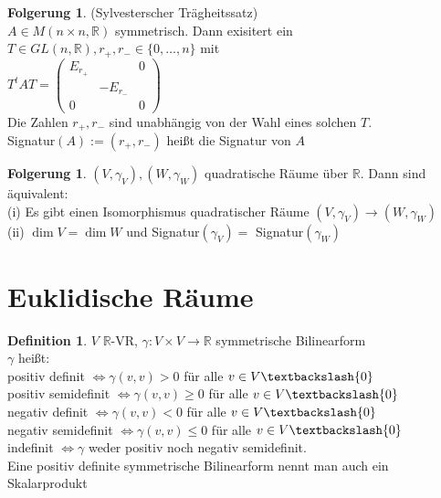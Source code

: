 \documentclass[10pt,a4paper,numbers=endperiod]{scrartcl}
\theoremstyle{definition}
\newtheorem{defi}[satz]{Definition}
\newtheorem{folg}[satz]{Folgerung}
\def\RR{{\mathbb R}}
\begin{document}
\begin{folg}
	(Sylvesterscher Trägheitssatz)\\
	$A \in M( n\times n, \RR)$ symmetrisch. Dann exisitert ein $T \in GL(n, \RR), r_+, r_- \in \{0,\ldots, n\}$ mit\\
	$T^tAT = \begin{pmatrix}
	E_{r_+} & & 0\\
	& -E_{r_-} & \\
	0 & & 0
	\end{pmatrix}$\\
	Die Zahlen $r_+, r_-$ sind unabhängig von der Wahl eines solchen $T$.\\ 
	Signatur$(A) := (r_+, r_-)$ heißt die Signatur von $A$ 
\end{folg}

\begin{folg}
	$(V, \gamma_V), (W, \gamma_W)$ quadratische Räume über $\RR$. Dann sind äquivalent:\\
	(i) Es gibt einen Isomorphismus quadratischer Räume $(V, \gamma_V) \rightarrow (W, \gamma_W)$\\
	(ii) $\dim V = \dim W$ und Signatur$(\gamma_V) =$ Signatur$(\gamma_W)$
\end{folg}

\section{Euklidische Räume}

\begin{defi}
	$V$ $\RR$-VR, $\gamma: V \times V \rightarrow \RR$ symmetrische Bilinearform\\
	$\gamma$ heißt:\\
	positiv definit $\Leftrightarrow \gamma(v,v) > 0$ für alle $v \in V \textbackslash \{0\}$\\
	positiv semidefinit $\Leftrightarrow \gamma(v,v) \geq 0$ für alle $v \in V \textbackslash \{0\}$\\
	negativ definit $\Leftrightarrow \gamma(v,v) < 0$ für alle $v \in V \textbackslash \{0\}$\\
	negativ semidefinit $\Leftrightarrow \gamma(v,v) \leq 0$ für alle $v \in V \textbackslash \{0\}$\\
	indefinit $\Leftrightarrow \gamma$ weder positiv noch negativ semidefinit.\\
	Eine positiv definite symmetrische Bilinearform nennt man auch ein Skalarprodukt
\end{defi}
\end{document}
